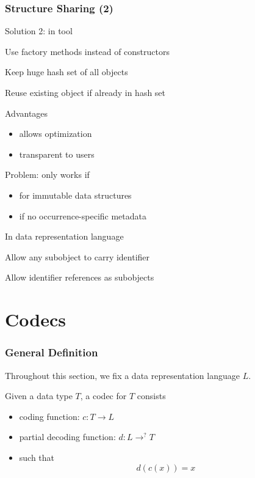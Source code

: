 \begin{frame}\frametitle{Structure Sharing (2)}
\begin{blockitems}{Solution 2: in tool}
\item Use factory methods instead of constructors
\item Keep huge hash set of all objects
\item Reuse existing object if already in hash set
\item Advantages
 \begin{itemize}
  \item allows optimization
  \item transparent to users
 \end{itemize}
\item Problem: only works if 
 \begin{itemize}
  \item for immutable data structures
  \item if no occurrence-specific metadata 
 \end{itemize}
\end{blockitems}

\begin{blockitems}{In data representation language}
\item Allow any subobject to carry identifier
\item Allow identifier references as subobjects
\end{blockitems}
\end{frame}

\section{Codecs}

\begin{frame}\frametitle{General Definition}
Throughout this section, we fix a data representation language $L$.

Given a data type $T$, a codec for $T$ consists
\begin{itemize}
 \item coding function: $c:T \to L$
 \item partial decoding function: $d:L\to^? T$
 \item such that
  \[d(c(x))=x\]
\end{itemize}
\end{frame}

